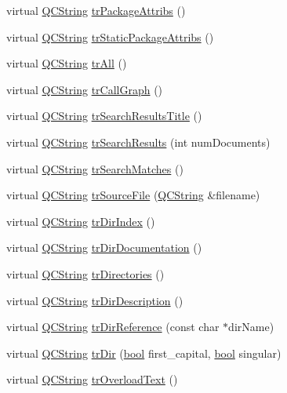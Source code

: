 \begin{DoxyCompactItemize}
\item 
virtual \hyperlink{class_q_c_string}{Q\+C\+String} \hyperlink{class_translator_slovene_a3243803d2a38ff05f0b82af0a7e734c7}{tr\+Package\+Attribs} ()
\item 
virtual \hyperlink{class_q_c_string}{Q\+C\+String} \hyperlink{class_translator_slovene_ab17a1659a2abd967872fa7a78aaf1dbf}{tr\+Static\+Package\+Attribs} ()
\item 
virtual \hyperlink{class_q_c_string}{Q\+C\+String} \hyperlink{class_translator_slovene_a03a83cef286998d2ac169efe64ea200b}{tr\+All} ()
\item 
virtual \hyperlink{class_q_c_string}{Q\+C\+String} \hyperlink{class_translator_slovene_a2ac7bc314de13a71dca04b10af9ebc75}{tr\+Call\+Graph} ()
\item 
virtual \hyperlink{class_q_c_string}{Q\+C\+String} \hyperlink{class_translator_slovene_ab83baf757fa3ee37089758b657191a2f}{tr\+Search\+Results\+Title} ()
\item 
virtual \hyperlink{class_q_c_string}{Q\+C\+String} \hyperlink{class_translator_slovene_a337000022455759ea3cdbee809497f44}{tr\+Search\+Results} (int num\+Documents)
\item 
virtual \hyperlink{class_q_c_string}{Q\+C\+String} \hyperlink{class_translator_slovene_a0446ae7058a03da42c15650f5948aea1}{tr\+Search\+Matches} ()
\item 
virtual \hyperlink{class_q_c_string}{Q\+C\+String} \hyperlink{class_translator_slovene_a5bb51484f92d4ebdfe1d1f5a60ad3337}{tr\+Source\+File} (\hyperlink{class_q_c_string}{Q\+C\+String} \&filename)
\item 
virtual \hyperlink{class_q_c_string}{Q\+C\+String} \hyperlink{class_translator_slovene_a918bd99647fd753504f052d39b004e79}{tr\+Dir\+Index} ()
\item 
virtual \hyperlink{class_q_c_string}{Q\+C\+String} \hyperlink{class_translator_slovene_a0a7b1a2c7f83f2c655fe28e3ddda8bf9}{tr\+Dir\+Documentation} ()
\item 
virtual \hyperlink{class_q_c_string}{Q\+C\+String} \hyperlink{class_translator_slovene_a7d975ec6d1c31123233ffbe5d6c7d846}{tr\+Directories} ()
\item 
virtual \hyperlink{class_q_c_string}{Q\+C\+String} \hyperlink{class_translator_slovene_ae3ac658a4e9073148fe3a021b1ca67e1}{tr\+Dir\+Description} ()
\item 
virtual \hyperlink{class_q_c_string}{Q\+C\+String} \hyperlink{class_translator_slovene_ad4fb72cba367a1abc0526ef9a6b057f6}{tr\+Dir\+Reference} (const char $\ast$dir\+Name)
\item 
virtual \hyperlink{class_q_c_string}{Q\+C\+String} \hyperlink{class_translator_slovene_a44f4fa649bd9b625c3f222b04f95d82a}{tr\+Dir} (\hyperlink{qglobal_8h_a1062901a7428fdd9c7f180f5e01ea056}{bool} first\+\_\+capital, \hyperlink{qglobal_8h_a1062901a7428fdd9c7f180f5e01ea056}{bool} singular)
\item 
virtual \hyperlink{class_q_c_string}{Q\+C\+String} \hyperlink{class_translator_slovene_ad89cf9e19c328cff11a3b253adf6e751}{tr\+Overload\+Text} ()
\end{DoxyCompactItemize}
